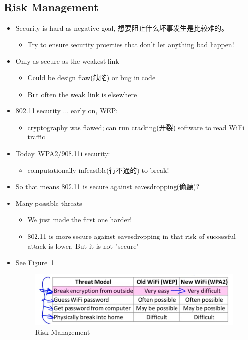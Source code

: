 \documentclass[12pt]{ctexart}   %
\begin{document}
	\subsection{Risk Management}
	\begin{itemize}
		\item Security is hard as negative goal, 想要阻止什么坏事发生是比较难的。
		\begin{itemize}
			\item Try to ensure \underline{security proerties} that don't let anything bad happen!
		\end{itemize}

		\item Only as secure as the weakest link
		\begin{itemize}
			\item Could be design flaw(缺陷) or bug in code
			\item But often the weak link is elsewhere
		\end{itemize}

		\item 802.11 security ... early on, WEP:
		\begin{itemize}
			\item cryptography was flawed; can run cracking(开裂) software to read WiFi traffic
		\end{itemize}

		\item Today, WPA2/908.11i security:
		\begin{itemize}
			\item computationally infeasible(行不通的) to break!
		\end{itemize}

		\item So that means 802.11 is secure against eavesdropping(偷聽)?
		\item Many possible threats
		\begin{itemize}
			\item We just made the first one harder!
			\item 802.11 is more secure against eavesdropping in that risk of successful attack is lower. But it is not "secure"
		\end{itemize}
		\item See Figure~\ref{fig:10-1-2}
		  
		\begin{figure}[h!] %
		\centering
		\includegraphics[scale=0.7]{images/10-1-2}
		\caption{Risk Management}
		\label{fig:10-1-2}
		\end{figure}
	\end{itemize}
\end{document}
